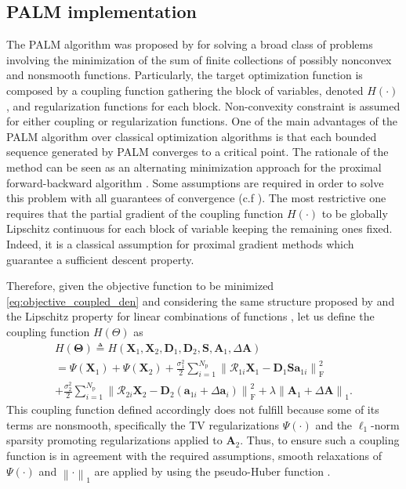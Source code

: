 \documentclass[review]{elsarticle}
\newcommand{\Npatch}{N_{\mathrm{p}}}
\begin{document}
\subsection{PALM implementation}
The PALM algorithm was proposed by \citet{bolte_proximal_2014} for solving a broad class of problems involving the minimization of the sum of finite collections of possibly nonconvex and nonsmooth functions. Particularly, the target optimization function is composed by a coupling function gathering the block of variables, denoted $H(\cdot)$, and regularization functions for each block. Non-convexity constraint is assumed for either coupling or regularization functions. One of the main advantages of the PALM algorithm over classical optimization algorithms is that each bounded sequence generated by PALM converges to a critical point. The rationale of the method can be seen as an alternating minimization approach for the proximal forward-backward algorithm \citep{combettes_signal_2005}. Some assumptions are required in order to solve this problem with all guarantees of convergence (c.f \citep[Assumption~1, Assumption~2]{bolte_proximal_2014}). The most restrictive one \citep[Assumption~2(ii)]{bolte_proximal_2014} requires that the partial gradient of the coupling function $H(\cdot)$ to be globally Lipschitz continuous for each block of variable keeping the remaining ones fixed. Indeed, it is a classical assumption for proximal gradient methods which guarantee a sufficient descent property.

Therefore, given the objective function to be minimized \eqref{eq:objective_coupled_den} and considering the same structure proposed by \citet{bolte_proximal_2014} and the Lipschitz property for linear combinations of functions \citep{eriksson_lipschitz_2004}, let us define the coupling function $H(\Theta)$ as
%
\begin{multline}
	\label{eq:objective_coupled_term}
  H\left(\boldsymbol{\Theta}\right) \triangleq  H\left(\mathbf{X}_{1},\mathbf{X}_{2},\mathbf{D}_{1},\mathbf{D}_{2},\mathbf{S},\mathbf{A}_{1},\Delta\mathbf{A}\right)  \\
 =\Psi\left(\mathbf{X}_{1}\right)   + \Psi\left(\mathbf{X}_{2}\right) + \frac{\sigma_{1}^2}{2}\sum_{i=1}^{\Npatch}\left\|\mathcal{R}_{1{i}}\mathbf{X}_{1} - \mathbf{D}_{1}\mathbf{S}\mathbf{a}_{1{i}}\right\|_{\mathrm{F}}^{2}\\
  +\frac{\sigma_{2}^2}{2}\sum_{i=1}^{\Npatch}\left\|\mathcal{R}_{2{i}}\mathbf{X}_{2} - \mathbf{D}_{2}\left(\mathbf{a}_{1{i}} + \Delta\mathbf{a}_{i}\right)\right\|_{\mathrm{F}}^{2} +  \lambda \left\|\mathbf{A}_{1}+\Delta\mathbf{A}\right\|_1.
\end{multline}
%
This coupling function defined accordingly does not fulfill
\citep[Assumption~2(ii)]{bolte_proximal_2014} because some of its terms are nonsmooth, specifically the TV regularizations $\Psi(\cdot)$ and the $\ell_{1}$-norm sparsity promoting regularizations applied to $\mathbf{A}_{2}$. Thus, to ensure such a coupling function is in agreement with the required assumptions, smooth relaxations of $\Psi(\cdot)$ and $\left\|\cdot\right\|_1$ are applied by using the pseudo-Huber function  \citep{fountoulakis_second_2016,jensen_implementation_2012}.
\end{document}

